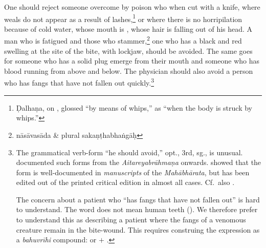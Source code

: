 \begin{translation}[resume]
One should reject someone overcome by poison who  
when cut with a knife, where weals do not appear as a result of  
 lashes,\footnote{Ḍalhaṇa, on , glossed  
“by means of whips,” as “when the body is struck by whips.”} or where 
there is no horripilation because of cold water, whose mouth is 
, whose hair is falling out of his head.  A man who is 
fatigued and those who stammer,\footnote{nāsāvasāda \& plural 
sakaṇṭhabhaṅgāḥ}  
one who has a black and red swelling at the site of the bite, with
lockjaw, should be avoided.  The same goes for someone who has a solid
plug emerge from their mouth  and someone who has blood running from
above and below.
% 
% 
The physician should also avoid a person who has fangs that have not
fallen out quickly.\footnote{The grammatical verb-form
     “he  should avoid,” opt., 3rd, sg., is unusual.
    \citet[10\,ff]{reno-1940} documented such forms from the
    \emph{Aitareyabrāhmaṇa} onwards.  \citet[\P  6.3.3 “Peculiar optative
    endings”, pp.\,176--177]{ober-2003} showed that the form is
    well-documented in \emph{manuscripts} of the \emph{Mahābhārata}, but
    has been edited out of the printed critical edition in almost all
    cases. Cf.\ also \cite{kuli-2006}.  
    
    The concern about a patient who “has fangs that have not fallen
out” is hard  to understand.  The word  does not mean
human teeth  ().  We therefore prefer to understand
this as describing a patient where the  fangs of a venomous
creature remain in the bite-wound.  This requires  construing the
expression as a \emph{bahuvrīhi} compound:  or
 $+$ .}
\end{translation}
